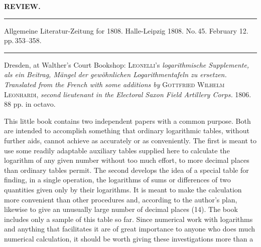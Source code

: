 \begin{center}
\textbf{REVIEW.}
\end{center}

\medskip
\noindent\rule{\linewidth}{.3pt}

\noindent Allgemeine Literatur-Zeitung for 1808. Halle-Leipzig 1808. No.\,45. February 12. pp.\,353--358.

\noindent\rule{\linewidth}{.3pt}
\medskip

Dresden, at Walther's Court Bookshop: \textsc{Leonelli}'s \emph{logarithmische Supplemente, als ein Beitrag, Mängel der gewöhnlichen Logarithmentafeln zu ersetzen. Translated from the French with some additions by} \textsc{Gottfried Wilhelm Leonhardi}, \emph{second lieutenant in the Electoral Saxon Field Artillery Corps.} 1806. 88 pp. in octavo.

This little book contains two independent papers with a common purpose. Both are intended to accomplish something that ordinary logarithmic tables, without further aids, cannot achieve as accurately or as conveniently. The first is meant to use some readily adaptable auxiliary tables supplied here to calculate the logarithm of any given number without too much effort, to more decimal places than ordinary tables permit. The second develops the idea of a special table for finding, in a single operation, the logarithms of sums or differences of two quantities given only by their logarithms. It is meant to make the calculation more convenient than other procedures and, according to the author's plan, likewise to give an unusually large number of decimal places (14). The book includes only a sample of this table so far. Since numerical work with logarithms and anything that facilitates it are of great importance to anyone who does much numerical calculation, it should be worth giving these investigations more than a
